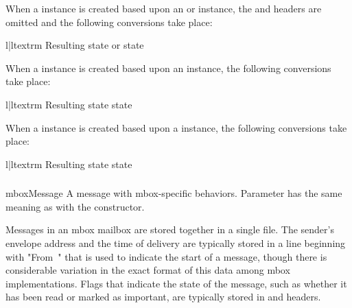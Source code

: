 When a  instance is created based upon an
 or  instance, the 
and  headers are omitted and the following conversions
take place:

\begin{tableii}{l|l}{textrm}
    {Resulting state}{ or  state}
\end{tableii}

When a  instance is created based upon an
 instance, the following conversions take place:

\begin{tableii}{l|l}{textrm}
    {Resulting state}{ state}
\end{tableii}

When a  instance is created based upon a
 instance, the following conversions take place:

\begin{tableii}{l|l}{textrm}
    {Resulting state}{ state}
\end{tableii}

\subsubsection{}
\label{mailbox-mboxmessage}

\begin{classdesc}{mboxMessage}{}
A message with mbox-specific behaviors. Parameter  has the same
meaning as with the  constructor.
\end{classdesc}

Messages in an mbox mailbox are stored together in a single file. The sender's
envelope address and the time of delivery are typically stored in a line
beginning with "From~" that is used to indicate the start of a message, though
there is considerable variation in the exact format of this data among mbox
implementations. Flags that indicate the state of the message, such as whether
it has been read or marked as important, are typically stored in
 and  headers.

